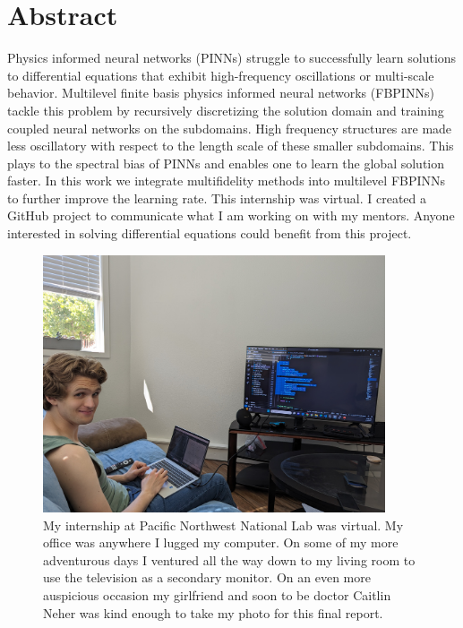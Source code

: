 \documentclass[12pt]{article}
\begin{document}
\section*{Abstract}
\begin{singlespace}
Physics informed neural networks (PINNs) struggle to successfully learn solutions to differential equations that exhibit high-frequency oscillations or multi-scale behavior. Multilevel finite basis physics informed neural networks (FBPINNs) tackle this problem by recursively discretizing the solution domain and training coupled neural networks on the subdomains. High frequency structures are made less oscillatory with respect to the length scale of these smaller subdomains. This plays to the spectral bias of PINNs and enables one to learn the global solution faster. In this work we integrate multifidelity methods into multilevel FBPINNs to further improve the learning rate. This internship was virtual. I created a GitHub project to communicate what I am working on with my mentors. Anyone interested in solving differential equations could benefit from this project.
\end{singlespace}
\vspace{1cm}
\begin{figure}[H]
\center
\includegraphics[width = 0.9\textwidth]{me.jpg}
\caption{My internship at Pacific Northwest National Lab was virtual. My office was anywhere I lugged my computer. On some of my more adventurous days I ventured all the way down to my living room to use the television as a secondary monitor. On an even more auspicious occasion my girlfriend and soon to be doctor Caitlin Neher was kind enough to take my photo for this final report.}
\end{figure}
\end{document}
